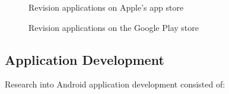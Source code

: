 \documentclass{article}
\begin{document}
\begin{figure}[H]
	\centering
	\caption{Revision applications on Apple's app store}
	\label{figure:appStoreApps}
\end{figure}
	
	\hfill
\begin{figure}[H]
	\centering
	\caption{Revision applications on the Google Play store}
	\label{figure:playStoreApps}
\end{figure}

\subsection{Application Development}

Research into Android application development consisted of: 
\end{document}

